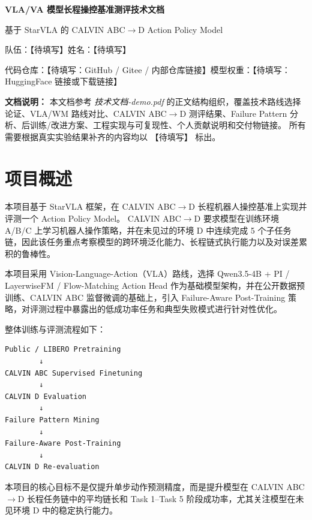 \documentclass[10pt,a4paper,fontset=none]{ctexart}
\newcommand{\todo}[1]{\textcolor{TodoRed}{【#1】}}
\newcommand{\StudentName}{\todo{待填写}}
\newcommand{\TeamName}{\todo{待填写}}
\newcommand{\RepoLink}{\todo{待填写：GitHub / Gitee / 内部仓库链接}}
\newcommand{\WeightLink}{\todo{待填写：HuggingFace 链接或下载链接}}
\newcommand{\BaseModel}{Qwen3.5-4B}
\newcommand{\ActionHead}{PI / LayerwiseFM / Flow-Matching Action Head}
\begin{document}
\begin{center}
  {\LARGE\bfseries VLA/VA 模型长程操控基准测评技术文档\par}
  \vspace{6pt}
  {\large 基于 StarVLA 的 CALVIN ABC$\rightarrow$D Action Policy Model\par}
  \vspace{6pt}
  {\normalsize 队伍：\TeamName \qquad 姓名：\StudentName\par}
  \vspace{4pt}
  {\small 代码仓库：\RepoLink \qquad 模型权重：\WeightLink\par}
\end{center}

\vspace{8pt}
\noindent\colorbox{StarLight}{%
\parbox{0.98\textwidth}{%
\textbf{文档说明：}
本文档参考 \textit{技术文档-demo.pdf} 的正文结构组织，覆盖技术路线选择论证、VLA/WM 路线对比、CALVIN ABC$\rightarrow$D 测评结果、Failure Pattern 分析、后训练/改进方案、工程实现与可复现性、个人贡献说明和交付物链接。
所有需要根据真实实验结果补齐的内容均以 \todo{待填写} 标出。
}}

\tableofcontents
\newpage

\section{项目概述}

本项目基于 StarVLA 框架，在 CALVIN ABC$\rightarrow$D 长程机器人操控基准上实现并评测一个 Action Policy Model。
CALVIN ABC$\rightarrow$D 要求模型在训练环境 A/B/C 上学习机器人操作策略，并在未见过的环境 D 中连续完成 5 个子任务链，因此该任务重点考察模型的跨环境泛化能力、长程链式执行能力以及对误差累积的鲁棒性。

本项目采用 Vision-Language-Action（VLA）路线，选择 \BaseModel{} + \ActionHead{} 作为基础模型架构，并在公开数据预训练、CALVIN ABC 监督微调的基础上，引入 Failure-Aware Post-Training 策略，对评测过程中暴露出的低成功率任务和典型失败模式进行针对性优化。

整体训练与评测流程如下：

\begin{lstlisting}[caption={整体训练与评测闭环}]
Public / LIBERO Pretraining
        ↓
CALVIN ABC Supervised Finetuning
        ↓
CALVIN D Evaluation
        ↓
Failure Pattern Mining
        ↓
Failure-Aware Post-Training
        ↓
CALVIN D Re-evaluation
\end{lstlisting}

本项目的核心目标不是仅提升单步动作预测精度，而是提升模型在 CALVIN ABC$\rightarrow$D 长程任务链中的平均链长和 Task 1--Task 5 阶段成功率，尤其关注模型在未见环境 D 中的稳定执行能力。
\end{document}
